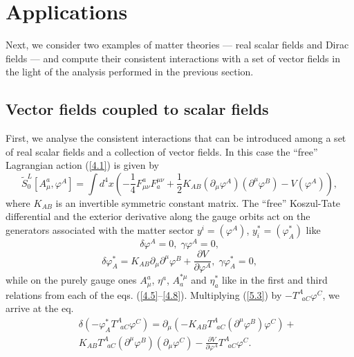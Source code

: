 \documentclass[a4paper,12pt]{article}
\begin{document}
\section{Applications}

Next, we consider two examples of
matter theories --- real scalar fields and
Dirac fields --- and compute their
consistent interactions with a set of
vector fields in the light of the
analysis performed in the previous section.

\subsection{Vector fields coupled to scalar fields}

First, we analyse the consistent interactions
that can be introduced among a
set of real scalar fields and a collection of
vector fields. In this case
the ``free'' Lagrangian action
(\ref{4.1}) is given by
\begin{equation}
\tilde{S}_{0}^{L}\left[ A_{\mu }^{a},\varphi ^{A}\right] =
\int d^{4}x\left( -%
\frac{1}{4}F_{\mu \nu }^{a}F_{a}^{\mu \nu }+
\frac{1}{2}K_{AB}\left( \partial
_{\mu }\varphi ^{A}\right) \left( 
\partial ^{\mu }\varphi ^{B}\right)
-V\left( \varphi ^{A}\right) \right) ,  \label{5.1}
\end{equation}
where $K_{AB}$ is an invertible symmetric
constant matrix. The ``free''
Koszul-Tate differential and the exterior
derivative along the gauge orbits
act on the generators associated with the
matter sector $y^{i}=\left(
\varphi ^{A}\right) $,
$y_{i}^{*}=\left( \varphi _{A}^{*}\right) $ like
\begin{equation}
\delta \varphi ^{A}=0,\;\gamma \varphi ^{A}=0,
\label{5.2}
\end{equation}
\begin{equation}
\delta \varphi _{A}^{*}=K_{AB}
\partial _{\mu }\partial ^{\mu }\varphi ^{B}+%
\frac{\partial V}{\partial
\varphi ^{A}},\;\gamma \varphi _{A}^{*}=0,
\label{5.3}
\end{equation}
while on the purely gauge ones
$A_{\mu }^{a}$, $\eta ^{a}$, $A_{a}^{*\mu }$
and $\eta _{a}^{*}$ like in the first
and third relations from each of the
eqs. (\ref{4.5}--\ref{4.8}).
Multiplying (\ref{5.3}) by $-T_{\;\;aC}^{A}%
\varphi ^{C}$, we arrive at the eq.
\begin{eqnarray}
&&\delta \left( -\varphi _{A}^{*}
T_{\;\;aC}^{A}\varphi ^{C}\right) =\partial
_{\mu }\left( -K_{AB}T_{\;\;aC}^{A}\left(
\partial ^{\mu }\varphi
^{B}\right) \varphi ^{C}\right) +
\nonumber \\
& &K_{AB}T_{\;\;aC}^{A}\left(
\partial ^{\mu }\varphi ^{B}\right) \left(
\partial _{\mu }\varphi ^{C}\right) -
\frac{\partial V}{\partial \varphi ^{A}}%
T_{\;\;aC}^{A}\varphi ^{C}.  \label{5.6}
\end{eqnarray}
\end{document}
